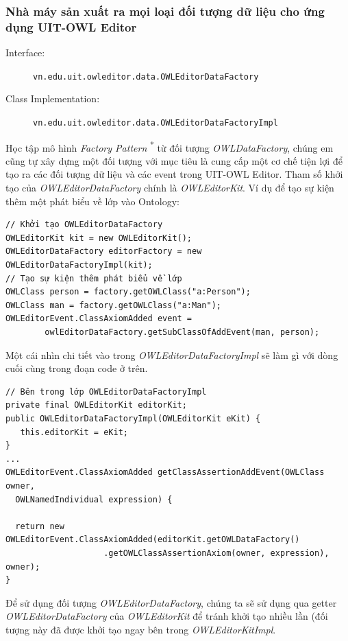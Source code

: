 \subsubsection{Nhà máy sản xuất ra mọi loại đối tượng dữ liệu cho ứng dụng UIT-OWL Editor}
{\let\thefootnote\relax{}
}
\begin{description}
\item[Interface:] \verb|vn.edu.uit.owleditor.data.OWLEditorDataFactory|
\item[Class Implementation:] \verb|vn.edu.uit.owleditor.data.OWLEditorDataFactoryImpl|
\end{description}
Học tập mô hình \textit{Factory Pattern} \textsuperscript{*} từ đối tượng \textit{OWLDataFactory}, chúng em cũng tự xây dựng một đối tượng với mục tiêu là cung cấp một cơ chế tiện lợi để tạo ra các đối tượng dữ liệu và các event trong UIT-OWL Editor. Tham số khởi tạo của \textit{OWLEditorDataFactory} chính là \textit{OWLEditorKit}. Ví dụ để tạo sự kiện thêm một phát biểu về lớp vào Ontology:
\begin{verbatim}
// Khởi tạo OWLEditorDataFactory
OWLEditorKit kit = new OWLEditorKit();
OWLEditorDataFactory editorFactory = new OWLEditorDataFactoryImpl(kit);
// Tạo sự kiện thêm phát biểu về lớp
OWLClass person = factory.getOWLClass("a:Person");
OWLClass man = factory.getOWLClass("a:Man");
OWLEditorEvent.ClassAxiomAdded event =
        owlEditorDataFactory.getSubClassOfAddEvent(man, person);
\end{verbatim}
Một cái nhìn chi tiết vào trong \textit{OWLEditorDataFactoryImpl} sẽ làm gì với dòng cuối cùng trong đoạn code ở trên.
\begin{verbatim}
// Bên trong lớp OWLEditorDataFactoryImpl
private final OWLEditorKit editorKit;
public OWLEditorDataFactoryImpl(OWLEditorKit eKit) {
   this.editorKit = eKit;
}
...
OWLEditorEvent.ClassAxiomAdded getClassAssertionAddEvent(OWLClass owner,
  OWLNamedIndividual expression) {

  return new OWLEditorEvent.ClassAxiomAdded(editorKit.getOWLDataFactory()
                    .getOWLClassAssertionAxiom(owner, expression), owner);
}
\end{verbatim}
Để sử dụng đối tượng \textit{OWLEditorDataFactory}, chúng ta sẽ sử dụng qua getter \textit{OWLEditorDataFactory} của \textit{OWLEditorKit} để tránh khởi tạo nhiều lần (đối tượng này đã được khởi tạo ngay bên trong \textit{OWLEditorKitImpl}.

